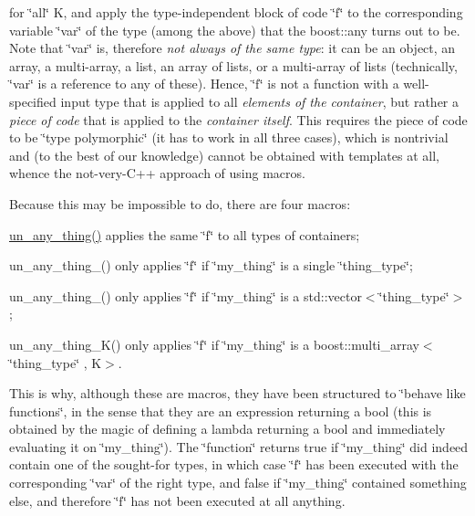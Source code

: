 for \char`\"{}all\char`\"{} K, and apply the type-\/independent block of code \char`\"{}f\char`\"{} to the corresponding variable \char`\"{}var\char`\"{} of the type (among the above) that the boost\+::any turns out to be. Note that \char`\"{}var\char`\"{} is, therefore {\itshape not always of the same type}\+: it can be an object, an array, a multi-\/array, a list, an array of lists, or a multi-\/array of lists (technically, \char`\"{}var\char`\"{} is a reference to any of these). Hence, \char`\"{}f\char`\"{} is not a function with a well-\/specified input type that is applied to all {\itshape elements of the container}, but rather a {\itshape piece of code} that is applied to the {\itshape container itself}. This requires the piece of code to be \char`\"{}type
polymorphic\char`\"{} (it has to work in all three cases), which is nontrivial and (to the best of our knowledge) cannot be obtained with templates at all, whence the not-\/very-\/\+C++ approach of using macros.

Because this may be impossible to do, there are four macros\+:


\begin{DoxyItemize}
\item \mbox{\hyperlink{group__boost__any__stuff_gab299af634bc1ca9be3a8d45a14560036}{un\+\_\+any\+\_\+thing()}} applies the same \char`\"{}f\char`\"{} to all types of containers;
\item un\+\_\+any\+\_\+thing\+\_() only applies \char`\"{}f\char`\"{} if \char`\"{}my\+\_\+thing\char`\"{} is a single \char`\"{}thing\+\_\+type\char`\"{};
\item un\+\_\+any\+\_\+thing\+\_() only applies \char`\"{}f\char`\"{} if \char`\"{}my\+\_\+thing\char`\"{} is a std\+::vector$<$\char`\"{}thing\+\_\+type\char`\"{}$>$;
\item un\+\_\+any\+\_\+thing\+\_\+\+K() only applies \char`\"{}f\char`\"{} if \char`\"{}my\+\_\+thing\char`\"{} is a boost\+::multi\+\_\+array$<$\char`\"{}thing\+\_\+type\char`\"{} , K$>$.
\end{DoxyItemize}

This is why, although these are macros, they have been structured to \char`\"{}behave like functions\char`\"{}, in the sense that they are an expression returning a bool (this is obtained by the magic of defining a lambda returning a bool and immediately evaluating it on \char`\"{}my\+\_\+thing\char`\"{}). The \char`\"{}function\char`\"{} returns true if \char`\"{}my\+\_\+thing\char`\"{} did indeed contain one of the sought-\/for types, in which case \char`\"{}f\char`\"{} has been executed with the corresponding \char`\"{}var\char`\"{} of the right type, and false if \char`\"{}my\+\_\+thing\char`\"{} contained something else, and therefore \char`\"{}f\char`\"{} has not been executed at all anything.

